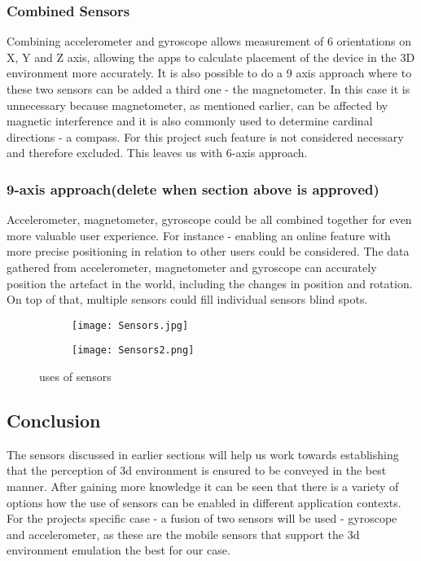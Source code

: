 \subsubsection*{Combined Sensors}
Combining accelerometer and gyroscope allows measurement of 6 orientations on X, Y and Z axis, allowing the apps to calculate placement of the device in the 3D environment more accurately.
It is also possible to do a 9 axis approach where to these two sensors can be added a third one - the magnetometer. In this case it is unnecessary because magnetometer, as mentioned earlier, can be affected by magnetic interference and it is also commonly used to determine cardinal directions -  a compass. For this project such feature is not considered necessary and therefore excluded. This leaves us with 6-axis approach.

\subsubsection*{9-axis approach(delete when section above is approved)}
Accelerometer, magnetometer, gyroscope could be all combined together for even more valuable user experience. For instance - enabling an online feature with more precise positioning in relation to other users could be considered. The data gathered from accelerometer, magnetometer and gyroscope can accurately position the artefact in the world, including the changes in position and rotation. On top of that, multiple sensors could fill individual sensors blind spots. 

\begin{figure}[H]
\begin{subfigure}{.5\textwidth}
  \centering
  \texttt{[image: Sensors.jpg]}
\end{subfigure}%
\begin{subfigure}{.5\textwidth}
  \centering
  \texttt{[image: Sensors2.png]}
\end{subfigure}
\caption{uses of sensors}
\end{figure}


\subsection{Conclusion}
The sensors discussed in earlier sections will help us work towards establishing that the perception of 3d environment is ensured to be conveyed in the best manner. After gaining more knowledge it can be seen that there is a variety of options how the use of sensors can be enabled in different application contexts. For the projects specific case - a fusion of two sensors will be used - gyroscope and accelerometer, as these are the mobile sensors that support the 3d environment emulation the best for our case.